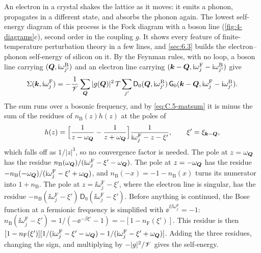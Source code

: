 An electron in a crystal shakes the lattice as it moves: it emits a phonon, propagates in a different state, and absorbs the phonon again. The lowest self-energy diagram of this process is the Fock diagram with a boson line (\cref{fig:4-diagrams}c), second order in the coupling $g$. It shows every feature of finite-temperature perturbation theory in a few lines, and \cref{sec:6.3} builds the electron--phonon self-energy of silicon on it. By the Feynman rules, with no loop, a boson line carrying $(\bm{Q},\mathrm{i}\omega^{\mathrm{B}}_{j'})$ and an electron line carrying $(\bm{k} - \bm{Q},\mathrm{i}\omega^{\mathrm{F}}_j - \mathrm{i}\omega^{\mathrm{B}}_{j'})$ give
\begin{equation*}
  \Sigma(\bm{k},\mathrm{i}\omega^{\mathrm{F}}_j) = -\frac1{\mathscr{V}}\sum_{\bm{Q}}|g(\bm{Q})|^2\,T\sum_{j'}\mathsf{D}_0(\bm{Q},\mathrm{i}\omega^{\mathrm{B}}_{j'})\,\mathsf{G}_0(\bm{k} - \bm{Q},\mathrm{i}\omega^{\mathrm{F}}_j - \mathrm{i}\omega^{\mathrm{B}}_{j'}) .
\end{equation*}
The sum runs over a bosonic frequency, and by \cref{eq:C.5-matsum} it is minus the sum of the residues of $n_{\mathrm{B}}(z)h(z)$ at the poles of
\begin{equation*}
  h(z) = \Bigl[\frac{1}{z - \omega_{\bm{Q}}} - \frac{1}{z + \omega_{\bm{Q}}}\Bigr]\frac{1}{\mathrm{i}\omega^{\mathrm{F}}_j - z - \xi'} , \qquad \xi' = \xi_{\bm{k}-\bm{Q}} ,
\end{equation*}
which falls off as $1/|z|^3$, so no convergence factor is needed. The pole at $z = \omega_{\bm{Q}}$ has the residue $n_{\mathrm{B}}(\omega_{\bm{Q}})/(\mathrm{i}\omega^{\mathrm{F}}_j - \xi' - \omega_{\bm{Q}})$. The pole at $z = -\omega_{\bm{Q}}$ has the residue $-n_{\mathrm{B}}(-\omega_{\bm{Q}})/(\mathrm{i}\omega^{\mathrm{F}}_j - \xi' + \omega_{\bm{Q}})$, and $n_{\mathrm{B}}(-x) = -1 - n_{\mathrm{B}}(x)$ turns its numerator into $1 + n_{\mathrm{B}}$. The pole at $z = \ii\omega^{\mathrm{F}}_j - \xi'$, where the electron line is singular, has the residue $-n_{\mathrm{B}}(\ii\omega^{\mathrm{F}}_j - \xi')\,\mathsf{D}_0(\ii\omega^{\mathrm{F}}_j - \xi')$. Before anything is continued, the Bose function at a fermionic frequency is simplified with $\ee^{\ii\beta\omega^{\mathrm{F}}_j} = -1$: $n_{\mathrm{B}}(\ii\omega^{\mathrm{F}}_j - \xi') = 1/(-\ee^{-\beta\xi'} - 1) = -[1 - n_{\mathrm{F}}(\xi')]$. This residue is then $[1 - n_{\mathrm{F}}(\xi')][1/(\mathrm{i}\omega^{\mathrm{F}}_j - \xi' - \omega_{\bm{Q}}) - 1/(\mathrm{i}\omega^{\mathrm{F}}_j - \xi' + \omega_{\bm{Q}})]$. Adding the three residues, changing the sign, and multiplying by $-|g|^2/\mathscr{V}$ gives the self-energy.
